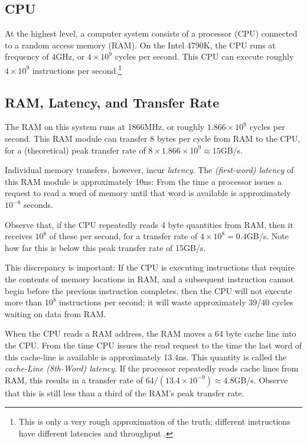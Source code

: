 \documentclass{patmorin}
\begin{document}
\subsection{CPU}

At the highest level, a computer system consists of a processor (CPU)
connected to a random access memory (RAM). On the Intel 4790K, the
CPU runs at frequency of 4GHz, or $4\times10^9$ cycles per second.
This CPU can execute roughly $4\times 10^{9}$ instructions per
second.\footnote{This is only a very rough approximation of the
truth; different instructions have different latencies and throughput
\cite{granlund:instruction}.}



\subsection{RAM, Latency, and Transfer Rate}

The RAM on this system runs at 1866MHz, or roughly $1.866\times10^9$
cycles per second.  This RAM module can transfer 8 bytes per cycle
from RAM to the CPU, for a (theoretical) peak transfer rate of $8\times
1.866\times10^9\approx 15$GB/s.

Individual memory transfers, however, incur \emph{latency}.  The
\emph{(first-word) latency} of this RAM module is approximately 10ns:
From the time a processor issues a request to read a word of memory
until that word is available is approximately $10^{-8}$ seconds.

Observe that, if the CPU repeatedly reads 4 byte quantities from RAM,
then it receives $10^8$ of these per second, for a transfer rate of
$4\times 10^8=0.4$GB/s.  Note how far this is below this peak transfer
rate of 15GB/s.

This discrepancy is important: If the CPU is executing instructions
that require the contents of memory locations in RAM, and a subsequent
instruction cannot begin before the previous instruction completes,
then the CPU will not execute more than $10^8$ instructions per second;
it will waste approximately 39/40 cycles waiting on data from RAM.

When the CPU reads a RAM address, the RAM moves a 64 byte cache line
into the CPU. From the time CPU issues the read request to the time
the last word of this cache-line is available is approximately 13.4ns.
This quantity is called the \emph{cache-Line (8th-Word) latency}.
If the processor repeatedly reads cache lines from RAM, this results in a
transfer rate of $64 / (13.4\times10^{-9}) \approx 4.8$GB/s.  Observe that
this is still less than a third of the RAM's peak transfer rate.
\end{document}
